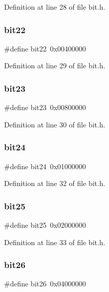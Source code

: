 Definition at line 28 of file bit.\+h.

\mbox{\label{bit_8h_af6a907882c579926bd286fed156bf155}} 
\subsubsection{bit22}
{\footnotesize\ttfamily \#define bit22~0x00400000}



Definition at line 29 of file bit.\+h.

\mbox{\label{bit_8h_a1eafe0b6dc814f4a090dfe9e468230a0}} 
\subsubsection{bit23}
{\footnotesize\ttfamily \#define bit23~0x00800000}



Definition at line 30 of file bit.\+h.

\mbox{\label{bit_8h_ad4888e401ac93acd0787c422b5ba3c3e}} 
\subsubsection{bit24}
{\footnotesize\ttfamily \#define bit24~0x01000000}



Definition at line 32 of file bit.\+h.

\mbox{\label{bit_8h_af45295eeb971500c75f9a026015681d4}} 
\subsubsection{bit25}
{\footnotesize\ttfamily \#define bit25~0x02000000}



Definition at line 33 of file bit.\+h.

\mbox{\label{bit_8h_a00197f76cf6c9990e55477bda32b342e}} 
\subsubsection{bit26}
{\footnotesize\ttfamily \#define bit26~0x04000000}



